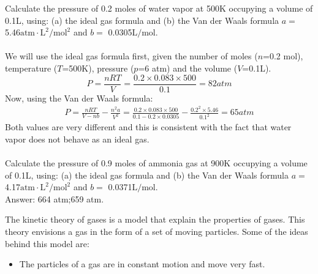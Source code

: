 \documentclass[main.tex]{subfiles}
\begin{document}
\begin{description}
\begin{example} %
Calculate the pressure of 0.2 moles of water vapor at 500K occupying a volume of 0.1L, using: (a) the ideal gas formula and (b) the Van der Waals formula $a=$ 5.46$\text{atm}\cdot \text{L}^2/\text{mol}^{2}$ and $b=$ 0.0305$\text{L}/\text{mol}$.\\
\\
We will use the ideal gas formula first, given the number of moles ($n$=0.2 mol), temperature ($T$=500K), pressure ($p$=6 atm) and the volume ($V$=0.1L).
\begin{equation*}
P=\frac{nRT}{V}=\frac{0.2\times 0.083\times 500}{0.1}=82atm   
\end{equation*}
Now, using the Van der Waals formula:
\begin{equation*}\begin{split}
P=\frac{nRT}{V-nb}-\frac{n^2a}{V^2}= \frac{0.2\times 0.083\times 500}{0.1-0.2\times 0.0305}-\frac{0.2^2\times 5.46}{0.1^2}=65atm 
\end{split}\end{equation*}
Both values are very different and this is consistent with the fact that water vapor does not behave as an ideal gas.
\\
\faDiamond\ \\
Calculate the pressure of 0.9 moles of ammonia gas at 900K occupying a volume of 0.1L, using: (a) the ideal gas formula and (b) the Van der Waals formula $a=$ 4.17$\text{atm}\cdot \text{L}^2/\text{mol}^{2}$ and $b=$ 0.0371$\text{L}/\text{mol}$.\\
\flushright Answer: 664 atm;659 atm.
\end{example}%
\item[\docfilehook{Kinetic theory of gases}{Kinetic theory of gases}] 
The kinetic theory of gases is a model that explain the properties of gases. This theory envisions a gas in the form of a set of moving particles. Some of the ideas behind this model are: 
\begin{itemize}
\item  The particles of a gas are in constant motion and move very fast.

\end{itemize}
\end{description}
\end{document}
